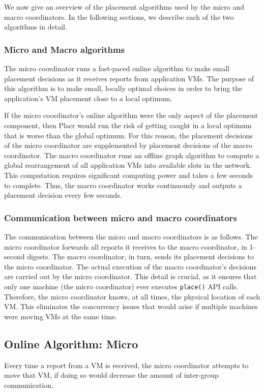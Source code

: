 \documentclass[11pt]{article}
\begin{document}
We now give an overview of the placement algorithms used by the micro and macro coordinators.  In the following sections, we describe each of the two algorithms in detail.

\subsubsection{Micro and Macro algorithms}

The micro coordinator runs a fast-paced online algorithm to make small placement decisions as it receives reports from application VMs.  The purpose of this algorithm is to make small, locally optimal choices in order to bring the application's VM placement close to a local optimum.

If the micro coordinator's online algorithm were the only aspect of the placement component, then Placr would run the risk of getting caught in a local optimum that is worse than the global optimum.  For this reason, the placement decisions of the micro coordinator are supplemented by placement decisions of the macro coordinator.  The macro coordinator runs an offline graph algorithm to compute a global rearrangement of all application VMs into available slots in the network.  This computation requires significant computing power and takes a few seconds to complete.  Thus, the macro coordinator works continuously and outputs a placement decision every few seconds.

\subsubsection{Communication between micro and macro coordinators}

The communication between the micro and macro coordinators is as follows.  The micro coordinator forwards all reports it receives to the macro coordinator, in 1-second digests.  The macro coordinator, in turn, sends its placement decisions to the micro coordinator.  The actual execution of the macro coordinator's decisions are carried out by the micro coordinator.  This detail is crucial, as it ensures that only one machine (the micro coordinator) ever executes {\tt place()} API calls.  Therefore, the micro coordinator knows, at all times, the physical location of each VM.  This eliminates the concurrency issues that would arise if multiple machines were moving VMs at the same time.


\subsection{Online Algorithm: Micro}
\newcommand{\VMa}{\textit{VM}_a}
\newcommand{\VMb}{\textit{VM}_b}
Every time a report from a VM is received, the micro coordinator attempts to move that VM, if doing so would decrease the amount of inter-group communication.
\end{document}

